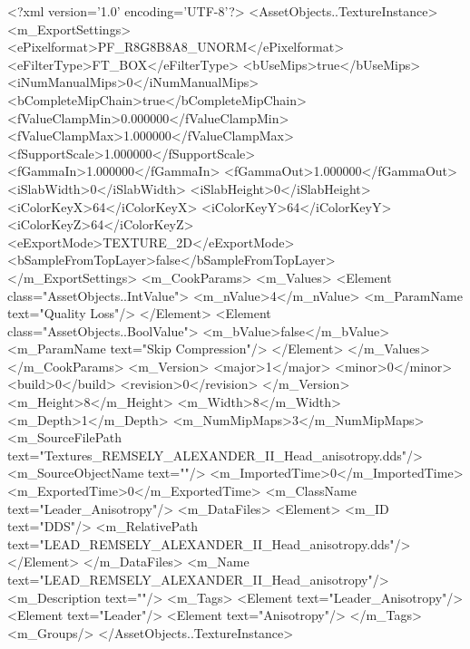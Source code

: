 <?xml version='1.0' encoding='UTF-8'?>
<AssetObjects..TextureInstance>
  <m_ExportSettings>
    <ePixelformat>PF_R8G8B8A8_UNORM</ePixelformat>
    <eFilterType>FT_BOX</eFilterType>
    <bUseMips>true</bUseMips>
    <iNumManualMips>0</iNumManualMips>
    <bCompleteMipChain>true</bCompleteMipChain>
    <fValueClampMin>0.000000</fValueClampMin>
    <fValueClampMax>1.000000</fValueClampMax>
    <fSupportScale>1.000000</fSupportScale>
    <fGammaIn>1.000000</fGammaIn>
    <fGammaOut>1.000000</fGammaOut>
    <iSlabWidth>0</iSlabWidth>
    <iSlabHeight>0</iSlabHeight>
    <iColorKeyX>64</iColorKeyX>
    <iColorKeyY>64</iColorKeyY>
    <iColorKeyZ>64</iColorKeyZ>
    <eExportMode>TEXTURE_2D</eExportMode>
    <bSampleFromTopLayer>false</bSampleFromTopLayer>
  </m_ExportSettings>
  <m_CookParams>
    <m_Values>
      <Element class="AssetObjects..IntValue">
        <m_nValue>4</m_nValue>
        <m_ParamName text="Quality Loss"/>
      </Element>
      <Element class="AssetObjects..BoolValue">
        <m_bValue>false</m_bValue>
        <m_ParamName text="Skip Compression"/>
      </Element>
    </m_Values>
  </m_CookParams>
  <m_Version>
    <major>1</major>
    <minor>0</minor>
    <build>0</build>
    <revision>0</revision>
  </m_Version>
  <m_Height>8</m_Height>
  <m_Width>8</m_Width>
  <m_Depth>1</m_Depth>
  <m_NumMipMaps>3</m_NumMipMaps>
  <m_SourceFilePath text="Textures\LEAD_REMSELY_ALEXANDER_II_Head_anisotropy.dds"/>
  <m_SourceObjectName text=""/>
  <m_ImportedTime>0</m_ImportedTime>
  <m_ExportedTime>0</m_ExportedTime>
  <m_ClassName text="Leader_Anisotropy"/>
  <m_DataFiles>
    <Element>
      <m_ID text="DDS"/>
      <m_RelativePath text="LEAD_REMSELY_ALEXANDER_II_Head_anisotropy.dds"/>
    </Element>
  </m_DataFiles>
  <m_Name text="LEAD_REMSELY_ALEXANDER_II_Head_anisotropy"/>
  <m_Description text=""/>
  <m_Tags>
    <Element text="Leader_Anisotropy"/>
    <Element text="Leader"/>
    <Element text="Anisotropy"/>
  </m_Tags>
  <m_Groups/>
</AssetObjects..TextureInstance>

